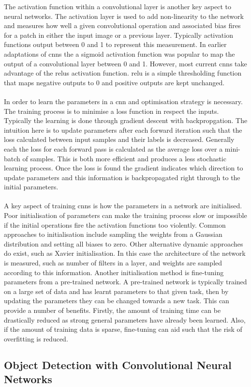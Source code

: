 The activation function within a convolutional layer is another key aspect to neural networks. The activation layer is used to add non-linearity to the network and measures how well a given convolutional operation and associated bias fires for a patch in either the input image or a previous layer. Typically activation functions output between 0 and 1 to represent this measurement. In earlier adaptations of \glspl{cnn} the a sigmoid activation function was popular to map the output of a convolutional layer between 0 and 1. However, most current \glspl{cnn} take advantage of the \glspl{relu} activation function. \gls{relu} is a simple thresholding function that maps negative outputs to 0 and positive outputs are kept unchanged.
\\\\
In order to learn the parameters in a \gls{cnn} and optimisation strategy is necessary. The training process is to minimise a loss function in respect the inputs. Typically the learning is done through gradient descent with backpropgation. The intuition here is to update parameters after each forward iteration such that the loss calculated between input samples and their labels is decreased. Generally each the loss for each forward pass is calculated as the average loss over a mini-batch of samples. This is both more efficient and produces a less stochastic learning process. Once the loss is found the gradient indicates which direction to update parameters and this information is backpropagated right through to the initial parameters.
\\\\
A key aspect of training \glspl{cnn} is how the parameters in a network are initialised. Poor initialisation of parameters can make the training process slow or impossible if the initial operations fire the activation functions too violently. Common approaches to initialisation include sampling the weights from a Gaussian distribution and setting all biases to zero. Other alternative dynamic approaches do exist, such as Xavier initialisation. In this case the architecture of the network is measured, such as number of filters in a layer, and weights are sampled according to this information. Another initialisation method is fine-tuning parameters from a pre-trained network. A pre-trained network is typically trained on a large set of data and has learnt parameters to that given task, then by updating the parameters they can be changed towards a new task. This can provide a number of benefits. Firstly, the amount of training time can be drastically reduced as strong general parameters have already been learned. Also, if the amount of training data is sparse, fine-tuning can aid such that the risk of overfitting is reduced.

\subsection{Object Detection with Convolutional Neural Networks}

